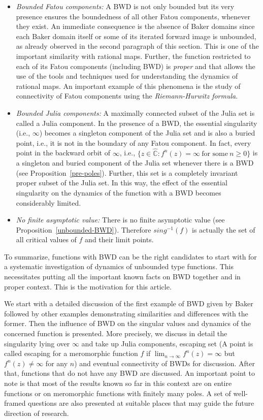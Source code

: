 \documentclass[11pt,a4paper]{article}
\begin{document}
\begin{itemize}
		\item \textit{Bounded Fatou components:}
	A BWD is not only bounded but its very presence ensures the boundedness of all other Fatou components, whenever they exist.  An immediate consequence is the absence of Baker domains since each Baker domain  itself or some of its iterated forward image is unbounded, as already observed in the second paragraph of this section. This is one of the important similarity with rational maps. Further, the function restricted to each of its Fatou components (including BWD) is \textit{proper} and that allows the use of the tools and techniques used for understanding the dynamics of rational maps. An important example of this phenomena is the study  of connectivity of Fatou components using the \textit{Riemann-Hurwitz formula}.
\item 	 \textit{Bounded Julia components:} 	A maximally connected subset of the Julia set is called a Julia component. In the presence of a BWD, the essential singularity (i.e., $\infty$) becomes a singleton component of the Julia set and is also a buried point, i.e., it is not in the boundary of any  Fatou component. In fact, every point in the backward orbit of $\infty$, i.e., $\{z \in \widehat{\mathbb{C}}: f^n (z)=\infty~\mbox{for some}~n\geq 0\}$ is a singleton and buried component of the Julia set whenever there is a BWD (see Proposition~\ref{pre-poles}). Further, this set is a completely invariant proper subset of the Julia set. In this way, the effect of the essential singularity on the dynamics of the function with a BWD becomes considerably limited.
\item   \textit{No finite asymptotic value:} There is no finite asymptotic value (see Proposition~\ref{unbounded-BWD}). Therefore $sing^{-1}(f)$ is actually the set of all critical values of $f$ and their limit points.
\end{itemize}  
 To summarize, functions with BWD can be the right candidates to start with for a systematic investigation of dynamics of unbounded type functions. This necessitates putting  all the important known facts on BWD together and in proper context. This is the motivation for this article. 
 \par We start with a detailed discussion of the first example of BWD given by Baker followed by other examples demonstrating similarities and differences with the former. Then the influence of BWD on the singular values and dynamics of the concerned function is presented. More precisely, we discuss in detail the singularity lying over $\infty$ and take up Julia components, escaping set (A point is called escaping for a meromorphic function $f$ if $\lim_{n \to \infty}f^n(z) = \infty$ but $f^n(z)\neq\infty $ for any $n$) and  eventual connectivity of BWDs for discussion. After that, functions that do not have any BWD are discussed. An important point to note is that most of the results known so far in this context are on entire functions or on meromorphic functions with finitely many poles.  A set of well-framed questions are also presented at suitable places that may guide the future direction of research.
 
\end{document}
